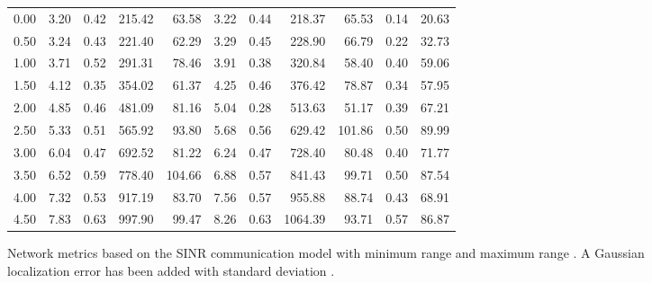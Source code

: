 \documentclass{article}
\begin{document}
\begin{figure}[h]
\begin{center}
\begin{tabular}{|r|rr|rr|rr|rr|rr|}
0.00 & 3.20 & 0.42 & 215.42 & 63.58 & 3.22 & 0.44 & 218.37 & 65.53 & 0.14 & 20.63\\
0.50 & 3.24 & 0.43 & 221.40 & 62.29 & 3.29 & 0.45 & 228.90 & 66.79 & 0.22 & 32.73\\
1.00 & 3.71 & 0.52 & 291.31 & 78.46 & 3.91 & 0.38 & 320.84 & 58.40 & 0.40 & 59.06\\
1.50 & 4.12 & 0.35 & 354.02 & 61.37 & 4.25 & 0.46 & 376.42 & 78.87 & 0.34 & 57.95\\
2.00 & 4.85 & 0.46 & 481.09 & 81.16 & 5.04 & 0.28 & 513.63 & 51.17 & 0.39 & 67.21\\
2.50 & 5.33 & 0.51 & 565.92 & 93.80 & 5.68 & 0.56 & 629.42 & 101.86 & 0.50 & 89.99\\
3.00 & 6.04 & 0.47 & 692.52 & 81.22 & 6.24 & 0.47 & 728.40 & 80.48 & 0.40 & 71.77\\
3.50 & 6.52 & 0.59 & 778.40 & 104.66 & 6.88 & 0.57 & 841.43 & 99.71 & 0.50 & 87.54\\
4.00 & 7.32 & 0.53 & 917.19 & 83.70 & 7.56 & 0.57 & 955.88 & 88.74 & 0.43 & 68.91\\
4.50 & 7.83 & 0.63 & 997.90 & 99.47 & 8.26 & 0.63 & 1064.39 & 93.71 & 0.57 & 86.87\\
\hline
\end{tabular}
\caption{Network metrics based on the SINR communication model with minimum range  and maximum range . A Gaussian localization error has been added with standard deviation .}
\label{exp_sinr_e}
\end{center}
\end{figure}
\end{document}
